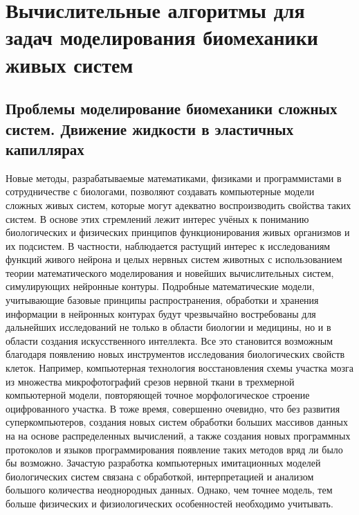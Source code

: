 \chapter{Вычислительные алгоритмы для задач моделирования биомеханики живых систем}\label{ch:ch1}

\section{Проблемы моделирование биомеханики сложных систем. Движение жидкости в эластичных капиллярах}\label{sec:ch1/sec1}

Новые методы, разрабатываемые математиками, физиками и программистами в сотрудничестве с биологами, позволяют создавать компьютерные модели сложных живых систем, которые могут адекватно воспроизводить свойства таких систем. В основе этих стремлений лежит интерес учёных к пониманию биологических и физических принципов функционирования живых организмов и их подсистем. В частности, наблюдается растущий интерес к исследованиям функций живого нейрона и целых нервных систем животных с использованием теории математического моделирования и новейших вычислительных систем, симулирующих нейронные контуры. Подробные математические модели, учитывающие базовые принципы распространения, обработки и хранения информации в нейронных контурах будут чрезвычайно востребованы для дальнейших исследований не только в области биологии и медицины, но и в области создания искусственного интеллекта.
Все это становится возможным благодаря появлению новых инструментов исследования биологических свойств клеток. Например, компьютерная технология восстановления схемы участка мозга из множества микрофотографий срезов нервной ткани \cite{CHKLOVSKII2010667} в трехмерной компьютерной модели, повторяющей точное морфологическое строение оцифрованного участка. В тоже время, совершенно очевидно, что без развития суперкомпьютеров, создания новых систем обработки больших массивов данных на на основе распределенных вычислений, а также  создания новых программных протоколов и языков программирования  появление таких методов вряд ли было бы возможно. Зачастую разработка компьютерных имитационных моделей биологических систем связана с обработкой, интерпретацией и анализом большого количества неоднородных данных. Однако, чем точнее модель, тем больше физических и физиологических особенностей необходимо учитывать.

